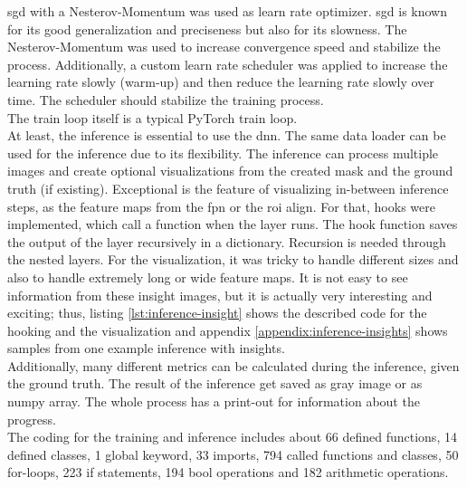		\ac{sgd} with a Nesterov-Momentum \cite{Botev2016} was used as learn rate optimizer. \ac{sgd} is known for its good generalization and preciseness but also for its slowness. The Nesterov-Momentum was used to increase convergence speed and stabilize the process. Additionally, a custom learn rate scheduler was applied to increase the learning rate slowly (warm-up) and then reduce the learning rate slowly over time. The scheduler should stabilize the training process.\\ The train loop itself is a typical PyTorch train loop. \\
		At least, the inference is essential to use the \ac{dnn}. The same data loader can be used for the inference due to its flexibility. The inference can process multiple images and create optional visualizations from the created mask and the ground truth (if existing). Exceptional is the feature of visualizing in-between inference steps, as the feature maps from the \ac{fpn} or the \ac{roi} align. For that, hooks were implemented, which call a function when the layer runs. The hook function saves the output of the layer recursively in a dictionary. Recursion is needed through the nested layers. For the visualization, it was tricky to handle different sizes and also to handle extremely long or wide feature maps. It is not easy to see information from these insight images, but it is actually very interesting and exciting; thus, listing \ref{lst:inference-insight} shows the described code for the hooking and the visualization and appendix \ref{appendix:inference-insights} shows samples from one example inference with insights.\\
		Additionally, many different metrics can be calculated during the inference, given the ground truth. The result of the inference get saved as gray image or as numpy array. The whole process has a print-out for information about the progress.\\
		The coding for the training and inference includes about 66 defined functions, 14 defined classes, 1 global keyword, 33 imports, 794 called functions and classes, 50 for-loops, 223 if statements, 194 bool operations and 182 arithmetic operations.
	
	
	
	
